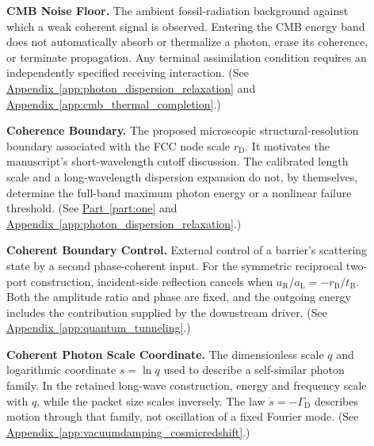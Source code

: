 \begin{description}
\item[] \begin{minipage}[t]{\linewidth}
\textbf{CMB Noise Floor.} The ambient fossil-radiation background against which a weak coherent signal is observed. Entering the CMB energy band does not automatically absorb or thermalize a photon, erase its coherence, or terminate propagation. Any terminal assimilation condition requires an independently specified receiving interaction.
(See \hyperref[app:photon_dispersion_relaxation]{Appendix~\ref*{app:photon_dispersion_relaxation}} and \hyperref[app:cmb_thermal_completion]{Appendix~\ref*{app:cmb_thermal_completion}}.)
\end{minipage}

\item[] \begin{minipage}[t]{\linewidth}
\textbf{Coherence Boundary.} The proposed microscopic structural-resolution boundary associated with the FCC node scale $r_{\mathrm D}$. It motivates the manuscript's short-wavelength cutoff discussion. The calibrated length scale and a long-wavelength dispersion expansion do not, by themselves, determine the full-band maximum photon energy or a nonlinear failure threshold.
(See \hyperref[part:one]{Part~\ref*{part:one}} and \hyperref[app:photon_dispersion_relaxation]{Appendix~\ref*{app:photon_dispersion_relaxation}}.)
\end{minipage}

\item[] \begin{minipage}[t]{\linewidth}
\textbf{Coherent Boundary Control.} External control of a barrier's scattering state by a second phase-coherent input. For the symmetric reciprocal two-port construction, incident-side reflection cancels when $a_{\mathrm R}/a_{\mathrm L}=-r_{\mathrm B}/t_{\mathrm B}$. Both the amplitude ratio and phase are fixed, and the outgoing energy includes the contribution supplied by the downstream driver.
(See \hyperref[app:quantum_tunneling]{Appendix~\ref*{app:quantum_tunneling}}.)
\end{minipage}

\item[] \begin{minipage}[t]{\linewidth}
\textbf{Coherent Photon Scale Coordinate.} The dimensionless scale $q$ and logarithmic coordinate $s=\ln q$ used to describe a self-similar photon family. In the retained long-wave construction, energy and frequency scale with $q$, while the packet size scales inversely. The law $\dot s=-\Gamma_{\mathrm D}$ describes motion through that family, not oscillation of a fixed Fourier mode.
(See \hyperref[app:vacuumdamping_cosmicredshift]{Appendix~\ref*{app:vacuumdamping_cosmicredshift}}.)
\end{minipage}


\end{description}
